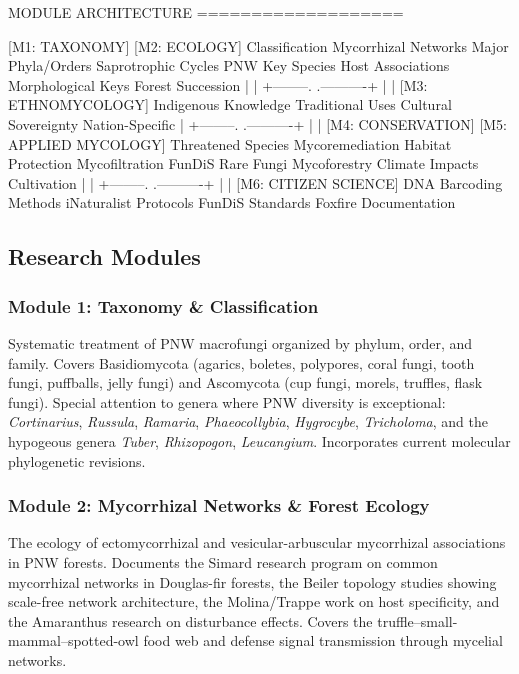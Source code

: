 \documentclass[11pt,letterpaper]{article}
\begin{document}
\begin{asciibox}
MODULE ARCHITECTURE
===================

  [M1: TAXONOMY]          [M2: ECOLOGY]
  Classification          Mycorrhizal Networks
  Major Phyla/Orders      Saprotrophic Cycles
  PNW Key Species         Host Associations
  Morphological Keys      Forest Succession
        |                       |
        +--------.  .----------+
                 |  |
           [M3: ETHNOMYCOLOGY]
           Indigenous Knowledge
           Traditional Uses
           Cultural Sovereignty
           Nation-Specific
                 |
        +--------.  .----------+
        |                       |
  [M4: CONSERVATION]     [M5: APPLIED MYCOLOGY]
  Threatened Species      Mycoremediation
  Habitat Protection      Mycofiltration
  FunDiS Rare Fungi       Mycoforestry
  Climate Impacts         Cultivation
        |                       |
        +--------.  .----------+
                 |  |
         [M6: CITIZEN SCIENCE]
         DNA Barcoding Methods
         iNaturalist Protocols
         FunDiS Standards
         Foxfire Documentation
\end{asciibox}

\subsection{Research Modules}

\subsubsection{Module 1: Taxonomy \& Classification}

Systematic treatment of PNW macrofungi organized by phylum, order, and family. Covers Basidiomycota (agarics, boletes, polypores, coral fungi, tooth fungi, puffballs, jelly fungi) and Ascomycota (cup fungi, morels, truffles, flask fungi). Special attention to genera where PNW diversity is exceptional: \textit{Cortinarius}, \textit{Russula}, \textit{Ramaria}, \textit{Phaeocollybia}, \textit{Hygrocybe}, \textit{Tricholoma}, and the hypogeous genera \textit{Tuber}, \textit{Rhizopogon}, \textit{Leucangium}. Incorporates current molecular phylogenetic revisions.

\subsubsection{Module 2: Mycorrhizal Networks \& Forest Ecology}

The ecology of ectomycorrhizal and vesicular-arbuscular mycorrhizal associations in PNW forests. Documents the Simard research program on common mycorrhizal networks in Douglas-fir forests, the Beiler topology studies showing scale-free network architecture, the Molina/Trappe work on host specificity, and the Amaranthus research on disturbance effects. Covers the truffle--small-mammal--spotted-owl food web and defense signal transmission through mycelial networks.
\end{document}
